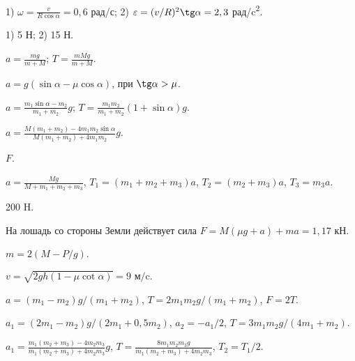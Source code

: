 \begin{Answer}{54}
1) $\omega = \frac{v}{R \cos \alpha} = 0,6$ рад/с; 2) $\varepsilon = (v/R)^2 \tg \alpha = 2,3$ рад/c\textsuperscript{2}.
\end{Answer}
\begin{Answer}{55}
1) 5 Н; 2) 15 Н.
\end{Answer}
\begin{Answer}{56}
$a = \frac{mg}{m+M}$; $T = \frac{mMg}{m+M}$.
\end{Answer}
\begin{Answer}{57}
$a = g (\sin \alpha - \mu \cos \alpha)$, при $\tg \alpha > \mu$.
\end{Answer}
\begin{Answer}{58}
$a = \frac{m_1 \sin \alpha - m_2}{m_1 + m_2}g$; $T = \frac{m_1 m_2}{m_1 + m_2}\left( 1+ \sin \alpha \right)g$.
\end{Answer}
\begin{Answer}{59}
$a = \frac{M(m_1 + m_2) - 4 m_1 m_2 \sin \alpha}{M(m_1 + m_2) + 4 m_1 m_2}g$.
\end{Answer}
\begin{Answer}{60}
$F$.
\end{Answer}
\begin{Answer}{65}
$a = \frac{Mg}{M + m_1 +m_2 +m_3}$, $T_1 = (m_1 +m_2 +m_3)a$, $T_2 = (m_2 +m_3)a$, $T_3 = m_3 a$.
\end{Answer}
\begin{Answer}{66}
200 H.
\end{Answer}
\begin{Answer}{68}
На лошадь со стороны Земли действует сила $F = M(\mu g + a) + ma = 1,17$ кН.
\end{Answer}
\begin{Answer}{69}
$m = 2(M - P/g)$.
\end{Answer}
\begin{Answer}{70}
$ v = \sqrt{2gh(1 - \mu \cot \alpha)} = 9 \textrm{ м/c}.$
\end{Answer}
\begin{Answer}{71}
$a = (m_1 - m_2)g / (m_1 + m_2)$, $T = 2 m_1 m_2 g /(m_1 + m_2)$, $F = 2T$.
\end{Answer}
\begin{Answer}{72}
$a_1 = (2m_1-m_2)g/(2m_1+0,5m_2)$, $a_2 = -a_1/2$, $T=3m_1 m_2g/(4m_1 + m_2)$.
\end{Answer}
\begin{Answer}{73}
$a_1 = \frac{m_1(m_2+m_3)-4m_2m_3}{m_1(m_2+m_3)+4m_2m_3}g$, $T= \frac{8m_1m_2m_3g}{m_1(m_2+m_3)+4m_2m_3}$, $T_2 = T_1/2$.
\end{Answer}
